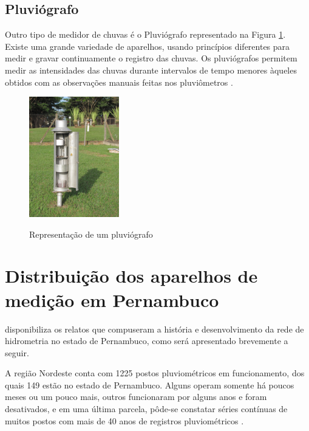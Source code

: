 \subsection{Pluviógrafo}

Outro tipo de medidor de chuvas é o Pluviógrafo representado na Figura \ref{fig:pluviografo}. Existe uma grande variedade de aparelhos, usando princípios diferentes para medir e gravar continuamente o registro das chuvas. Os pluviógrafos permitem medir as intensidades das chuvas durante intervalos de tempo menores àqueles obtidos com as observações manuais feitas nos pluviômetros \cite{tucci1993}.

\begin{figure}[h]
    \caption{Representação de um pluviógrafo}
    \centering
    \includegraphics[width=0.35\textwidth, keepaspectratio]{Textuais/Figuras/pluviografo.jpg}
    \label{fig:pluviografo}
\end{figure}

\section{Distribuição dos aparelhos de medição em Pernambuco}

 disponibiliza os relatos que compuseram a história e desenvolvimento da rede de hidrometria no estado de Pernambuco, como será apresentado brevemente a seguir.

A região Nordeste conta com 1225 postos pluviométricos em funcionamento, dos quais 149 estão no estado de Pernambuco. Alguns operam somente há poucos meses ou um pouco mais, outros funcionaram por alguns anos e foram desativados, e em uma última parcela, pôde-se constatar séries contínuas de muitos postos com mais de 40 anos de registros pluviométricos \cite{analise-pernambuco}.

